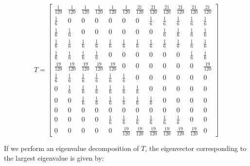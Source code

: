 \documentclass[fleqn]{article}
\begin{document}
\begin{enumerate}[nolistsep]
\begin{enumerate}
			\begin{equation*}
				T = \begin{bmatrix}
					\frac{1}{120} & \frac{1}{120} & \frac{1}{120} & \frac{1}{120} & \frac{1}{120} & \frac{1}{120} & \frac{21}{120} & \frac{21}{120} & \frac{21}{120} & \frac{21}{120} & \frac{21}{120} & \frac{21}{120}\\[3pt]
					\frac{1}{6} & 0 & 0 & 0 & 0 & 0 & 0 & \frac{1}{6} & \frac{1}{6} & \frac{1}{6} & \frac{1}{6} & \frac{1}{6}\\[3pt]
					\frac{1}{6} & \frac{1}{6} & 0 & 0 & 0 & 0 & 0 & 0 & \frac{1}{6} & \frac{1}{6} & \frac{1}{6} & \frac{1}{6}\\[3pt]
					\frac{1}{6} & \frac{1}{6} & \frac{1}{6} & \frac{1}{6} & \frac{1}{6} & \frac{1}{6} & \frac{1}{6} & \frac{1}{6} & \frac{1}{6} & \frac{1}{6} & \frac{1}{6} & \frac{1}{6}\\[3pt]
					\frac{1}{6} & \frac{1}{6} & \frac{1}{6} & \frac{1}{6} & 0 & 0 & 0 & 0 & 0 & 0 & \frac{1}{6} & \frac{1}{6}\\[3pt]
					\frac{19}{120} & \frac{19}{120} & \frac{19}{120} & \frac{19}{120} & \frac{19}{120} & 0 & 0 & 0 & 0 & 0 & 0 & \frac{19}{120}\\[3pt]
					\frac{1}{6} & \frac{1}{6} & \frac{1}{6} & \frac{1}{6} & \frac{1}{6} & \frac{1}{6} & 0 & 0 & 0 & 0 & 0 & 0\\[3pt]
					0 & \frac{1}{6} & \frac{1}{6} & \frac{1}{6} & \frac{1}{6} & \frac{1}{6} & \frac{1}{6} & 0 & 0 & 0 & 0 & 0\\[3pt]
					0 & 0 & \frac{1}{6} & \frac{1}{6} & \frac{1}{6} & \frac{1}{6} & \frac{1}{6} & \frac{1}{6} & 0 & 0 & 0 & 0\\[3pt]
					0 & 0 & 0 & 0 & 0 & 0 & 0 & 0 & 0 & 0 & 0 & 0\\[3pt]
					0 & 0 & 0 & 0 & \frac{1}{6} & \frac{1}{6} & \frac{1}{6} & \frac{1}{6} & \frac{1}{6} & \frac{1}{6} & 0 & 0\\[3pt]
					0 & 0 & 0 & 0 & 0 & \frac{19}{120} & \frac{19}{120} & \frac{19}{120} & \frac{19}{120} & \frac{19}{120} & \frac{19}{120} & 0
				\end{bmatrix}
			\end{equation*}
			
			If we perform an eigenvalue decomposition of $T$, the eigenvector corresponding to the largest eigenvalue is given by:
			

\end{enumerate}
\end{enumerate}
\end{document}
